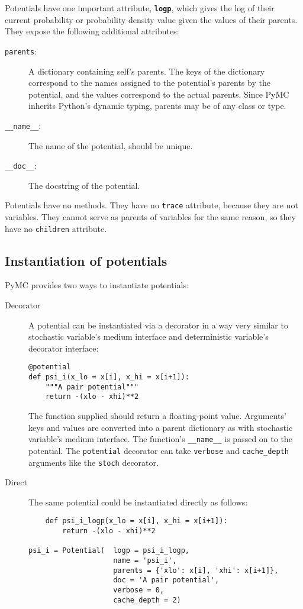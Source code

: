 \bigskip
Potentials have one important attribute, \texttt{\bfseries logp}, which gives the log of their current probability or probability density value given the values of their parents. They expose the following additional attributes:
\begin{description}
    \item[\texttt{parents}:] A dictionary containing self's parents. The keys of the dictionary correspond to the names assigned to the potential's parents by the potential, and the values correspond to the actual parents. Since PyMC inherits Python's dynamic typing, parents may be of any class or type.
    \item[\texttt{__name__}:] The name of the potential, should be unique.
    \item[\texttt{__doc__}:] The docstring of the potential.
\end{description}
Potentials have no methods. They have no \texttt{trace} attribute, because they are not variables. They cannot serve as parents of variables for the same reason, so they have no \texttt{children} attribute.


\subsection{Instantiation of potentials}
PyMC provides two ways to instantiate potentials:
\begin{description}
    \item[Decorator] A potential can be instantiated via a decorator in a way very similar to stochastic variable's medium interface and deterministic variable's decorator interface:
\begin{verbatim}
@potential
def psi_i(x_lo = x[i], x_hi = x[i+1]):
    """A pair potential"""
    return -(xlo - xhi)**2
\end{verbatim}
The function supplied should return a floating-point value. Arguments' keys and values are converted into a parent dictionary as with stochastic variable's medium interface. The function's \texttt{__name__} is passed on to the potential. The \texttt{potential} decorator can take \texttt{verbose} and \texttt{cache_depth} arguments like the \texttt{stoch} decorator.
    \item[Direct] The same potential could be instantiated directly as follows:
\begin{verbatim}
    def psi_i_logp(x_lo = x[i], x_hi = x[i+1]):
        return -(xlo - xhi)**2
        
psi_i = Potential(  logp = psi_i_logp, 
                    name = 'psi_i',
                    parents = {'xlo': x[i], 'xhi': x[i+1]},
                    doc = 'A pair potential',
                    verbose = 0,
                    cache_depth = 2)
\end{verbatim}
\end{description}

